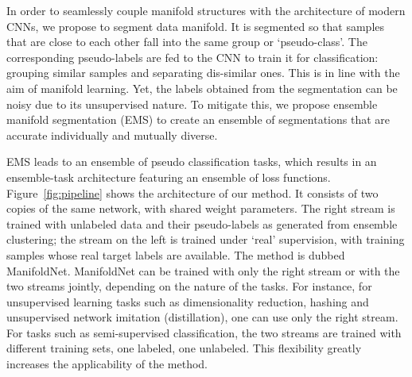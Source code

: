 \documentclass{bmvc2k}
\begin{document}
In order to seamlessly couple manifold structures with the architecture
of modern CNNs, we propose to segment data manifold. It is segmented so 
that samples that are close to each other fall into the same group or 
`pseudo-class'. The corresponding pseudo-labels are fed to the CNN to 
train it for classification: grouping similar samples and separating 
dis-similar ones. This is in line with the aim of manifold learning. 
Yet, the labels obtained from the segmentation can be noisy 
due to its unsupervised nature. To mitigate this, 
we propose ensemble manifold segmentation (EMS) to create an ensemble of segmentations that are accurate individually and mutually diverse. 


EMS leads to an ensemble of pseudo classification tasks, which results
in an ensemble-task architecture featuring an ensemble of loss
functions.  Figure~\ref{fig:pipeline} shows the architecture
of our method. It consists of two copies of the same network, with 
shared weight parameters. The right stream is trained with 
unlabeled data and their pseudo-labels as generated from ensemble clustering; the stream on the left is trained under `real' supervision, 
with training samples whose real target labels are available. The method is dubbed ManifoldNet. 
ManifoldNet can be trained with only the right stream or with the two 
streams jointly, depending on the nature of the tasks. 
For instance, for unsupervised learning tasks such as dimensionality reduction, hashing and unsupervised network imitation (distillation), one can use only the right stream. 
For tasks such as semi-supervised classification, the two streams are trained with different training sets,  one labeled, one unlabeled. This flexibility greatly increases the applicability of the method.


\end{document}
